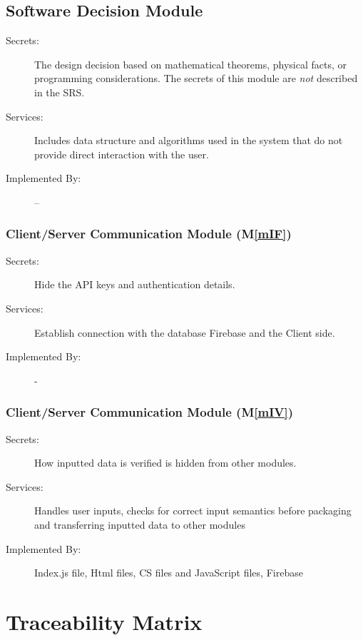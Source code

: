 \documentclass[12pt, titlepage]{article}
\newcommand{\mref}[1]{M\ref{#1}}
\begin{document}
\subsection{Software Decision Module}

\begin{description}
\item[Secrets:] The design decision based on mathematical theorems, physical
  facts, or programming considerations. The secrets of this module are
  \emph{not} described in the SRS.
\item[Services:] Includes data structure and algorithms used in the system that
  do not provide direct interaction with the user. 
\item[Implemented By:] --
\end{description}

\subsubsection{Client/Server Communication Module (\mref{mIF})}
\begin{description}
\item[Secrets:]Hide the API keys and authentication details.
\item[Services:]Establish connection with the database Firebase and the Client side.
\item[Implemented By:]-
\end{description}

\subsubsection{Client/Server Communication Module (\mref{mIV})}
\begin{description}
\item[Secrets:]How inputted data is verified is hidden from other modules.
\item[Services:]Handles user inputs, checks for correct input semantics before packaging and transferring inputted data to other modules
\item[Implemented By:]Index.js file, Html files, CS files and JavaScript files, Firebase
\end{description}


\section{Traceability Matrix} \label{SecTM}
\end{document}
